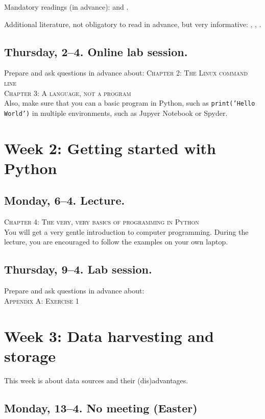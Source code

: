 Mandatory readings (in advance): \cite{boyd2012} and \cite{Kitchin2014}. 

Additional literature, not obligatory to read in advance, but very informative: \cite{Mahrt2013}, \cite{Vis2013}, \cite{Trilling2017a}.



\subsection*{Thursday, 2--4. Online lab session.}

Prepare and ask questions in advance about:
\textsc{ Chapter 2: The Linux command line}\\
\textsc{ Chapter 3: A language, not a program}\\

Also, make sure that you can a basic program in Python, such as \texttt{print('Hello World')} in multiple environments, such as Jupyer Notebook or Spyder.


\section*{Week 2: Getting started with Python}

\subsection*{Monday, 6--4. Lecture.}
\textsc{ Chapter 4: The very, very basics of programming in Python}\\
You will get a very gentle introduction to computer programming. During the lecture, you are encouraged to follow the examples on your own laptop.


\subsection*{Thursday, 9--4. Lab session.}
Prepare and ask questions in advance about:\\
\textsc{ Appendix A: Exercise 1}\\



\section*{Week 3: Data harvesting and storage}
This week is about data sources and their (dis)advantages. 

\subsection*{Monday, 13--4. No meeting (Easter)}
